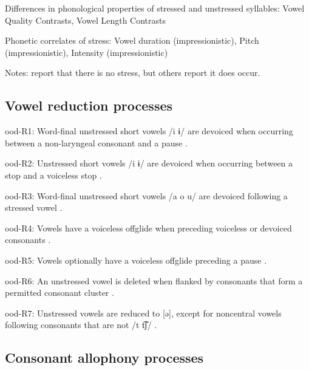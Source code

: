 {\begin{appendixdesc}
\item[Differences in phonological properties of stressed and unstressed syllables:] Vowel Quality Contrasts, Vowel Length Contrasts

\item[Phonetic correlates of stress:] Vowel duration (impressionistic), Pitch (impressionistic), Intensity (impressionistic)

\item[Notes:] \citet{DoloresMathiot1991} report that there is no stress, but others report it does occur.
\end{appendixdesc}
\subsection*{Vowel reduction processes}
\begin{appendixdesc}

\item[ood-R1:] Word-final unstressed short vowels /i ɨ/ are devoiced when occurring between a non-laryngeal consonant and a pause \citep[31]{Saxton1963}.

\item[ood-R2:] Unstressed short vowels /i ɨ/ are devoiced when occurring between a stop and a voiceless stop \citep[31]{Saxton1963}.

\item[ood-R3:] Word-final unstressed short vowels /a o u/ are devoiced following a stressed vowel \citep[31]{Saxton1963}.

\item[ood-R4:] Vowels have a voiceless offglide when preceding voiceless or devoiced consonants \citep[31]{Saxton1963}.

\item[ood-R5:] Vowels optionally have a voiceless offglide preceding a pause \citep[31]{Saxton1963}.

\item[ood-R6:] An unstressed vowel is deleted when flanked by consonants that form a permitted consonant cluster \citep[103]{Saxton1982}.

\item[ood-R7:] Unstressed vowels are reduced to [ə], except for noncentral vowels following consonants that are not /t t͡ʃ/ \citep[104]{Saxton1982}.
\end{appendixdesc}
\subsection*{Consonant allophony processes}
\begin{appendixdesc}


\end{appendixdesc}}
